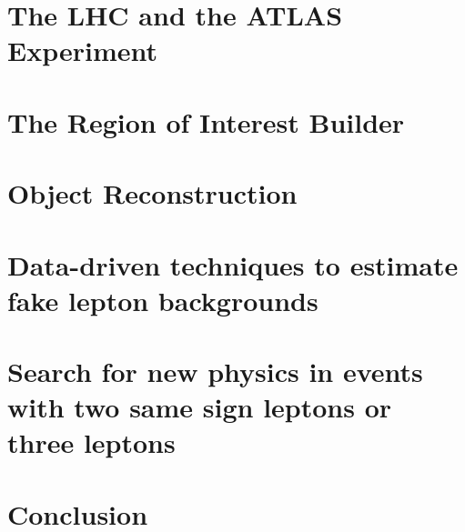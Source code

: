 \documentclass{outhesis}
\begin{document}
\chapter{The LHC and the ATLAS Experiment}\label{sec:lhcatlas}


\chapter{The Region of Interest Builder}\label{sec:roib}


\chapter{Object Reconstruction}\label{sec:reco}


\chapter{Data-driven techniques to estimate fake lepton backgrounds}\label{sec:fake}


\chapter{Search for new physics in events with two same sign leptons or three leptons}\label{sec:ss3l}


\chapter*{Conclusion}\label{sec:concl}






% 
% 

\end{document}
